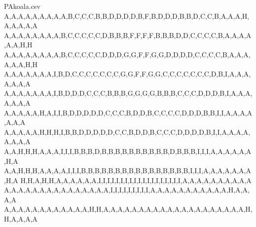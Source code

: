 \documentclass{article}
\begin{document}
\begin{filecontents*}[overwrite]{PAkoala.csv}
A,A,A,A,A,A,A,A,A,B,C,C,C,B,B,D,D,D,D,B,F,B,D,D,D,B,B,D,C,C,B,A,A,A,H,A,A,A,A,A
A,A,A,A,A,A,A,A,B,C,C,C,C,C,D,B,B,B,F,F,F,F,B,B,B,D,D,C,C,C,C,B,A,A,A,A,A,A,H,H
A,A,A,A,A,A,A,A,B,C,C,C,C,C,D,D,D,G,G,F,F,G,G,D,D,D,D,C,C,C,C,B,A,A,A,A,A,A,H,H
A,A,A,A,A,A,A,I,B,D,C,C,C,C,C,C,C,G,G,F,F,G,G,C,C,C,C,C,C,C,D,B,I,A,A,A,A,A,A,A
A,A,A,A,A,A,A,I,B,D,D,D,C,C,C,B,B,B,G,G,G,G,B,B,B,C,C,C,D,D,D,B,I,A,A,A,A,A,A,A
A,A,A,A,A,H,A,I,I,B,D,D,D,D,D,C,C,C,B,D,D,B,C,C,C,C,D,D,D,B,B,I,I,A,A,A,A,A,A,A
A,A,A,A,A,H,H,H,I,B,B,D,D,D,D,D,C,C,B,D,D,B,C,C,C,D,D,D,D,B,I,I,A,A,A,A,A,A,A,A
A,A,H,H,H,A,A,A,I,I,I,B,B,B,D,B,B,B,B,B,B,B,B,B,B,D,B,B,B,I,I,I,A,A,A,A,A,A,H,A
A,A,H,H,H,A,A,A,A,I,I,I,B,B,B,B,B,B,B,B,B,B,B,B,B,B,B,B,I,I,I,A,A,A,A,A,A,A,H,A
H,H,A,H,H,A,A,A,A,A,A,I,I,I,I,I,I,I,I,I,I,I,I,I,I,I,I,I,I,I,A,A,A,A,A,A,A,A,A,A
A,A,A,A,A,A,A,A,A,A,A,A,A,A,A,I,I,I,I,I,I,I,I,I,A,A,A,A,A,A,A,A,A,A,A,H,A,A,A,A
A,A,A,A,A,A,A,A,A,A,A,A,H,H,A,A,A,A,A,A,A,A,A,A,A,A,A,A,A,A,A,A,A,A,H,H,A,A,A,A
\end{filecontents*}

\def\listcoulkoala{VertForet,Noir,GrisClair,GrisFonce,Beige,Blanc,BleuClair,VertClair,Marron}
\end{document}
